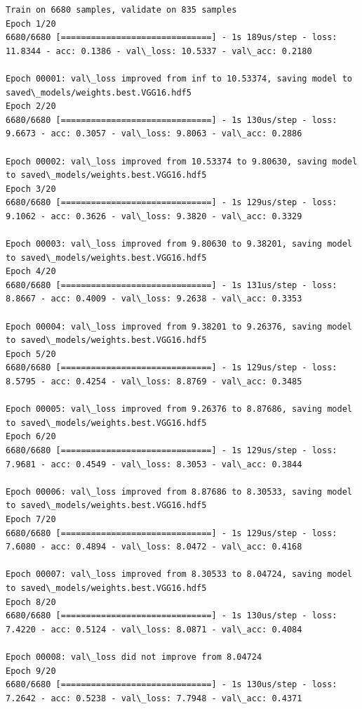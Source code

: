 \documentclass[11pt]{article}
\begin{document}
    \begin{Verbatim}[commandchars=\\\{\}]
Train on 6680 samples, validate on 835 samples
Epoch 1/20
6680/6680 [==============================] - 1s 189us/step - loss: 11.8344 - acc: 0.1386 - val\_loss: 10.5337 - val\_acc: 0.2180

Epoch 00001: val\_loss improved from inf to 10.53374, saving model to saved\_models/weights.best.VGG16.hdf5
Epoch 2/20
6680/6680 [==============================] - 1s 130us/step - loss: 9.6673 - acc: 0.3057 - val\_loss: 9.8063 - val\_acc: 0.2886

Epoch 00002: val\_loss improved from 10.53374 to 9.80630, saving model to saved\_models/weights.best.VGG16.hdf5
Epoch 3/20
6680/6680 [==============================] - 1s 129us/step - loss: 9.1062 - acc: 0.3626 - val\_loss: 9.3820 - val\_acc: 0.3329

Epoch 00003: val\_loss improved from 9.80630 to 9.38201, saving model to saved\_models/weights.best.VGG16.hdf5
Epoch 4/20
6680/6680 [==============================] - 1s 131us/step - loss: 8.8667 - acc: 0.4009 - val\_loss: 9.2638 - val\_acc: 0.3353

Epoch 00004: val\_loss improved from 9.38201 to 9.26376, saving model to saved\_models/weights.best.VGG16.hdf5
Epoch 5/20
6680/6680 [==============================] - 1s 129us/step - loss: 8.5795 - acc: 0.4254 - val\_loss: 8.8769 - val\_acc: 0.3485

Epoch 00005: val\_loss improved from 9.26376 to 8.87686, saving model to saved\_models/weights.best.VGG16.hdf5
Epoch 6/20
6680/6680 [==============================] - 1s 129us/step - loss: 7.9681 - acc: 0.4549 - val\_loss: 8.3053 - val\_acc: 0.3844

Epoch 00006: val\_loss improved from 8.87686 to 8.30533, saving model to saved\_models/weights.best.VGG16.hdf5
Epoch 7/20
6680/6680 [==============================] - 1s 129us/step - loss: 7.6080 - acc: 0.4894 - val\_loss: 8.0472 - val\_acc: 0.4168

Epoch 00007: val\_loss improved from 8.30533 to 8.04724, saving model to saved\_models/weights.best.VGG16.hdf5
Epoch 8/20
6680/6680 [==============================] - 1s 130us/step - loss: 7.4220 - acc: 0.5124 - val\_loss: 8.0871 - val\_acc: 0.4084

Epoch 00008: val\_loss did not improve from 8.04724
Epoch 9/20
6680/6680 [==============================] - 1s 130us/step - loss: 7.2642 - acc: 0.5238 - val\_loss: 7.7948 - val\_acc: 0.4371


\end{Verbatim}
\end{document}
